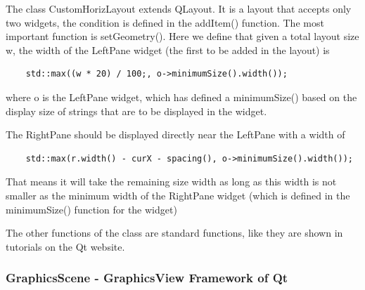 The class CustomHorizLayout extends QLayout. It is a layout that accepts only two widgets, the condition is defined in the addItem() function. The most important function is setGeometry(). Here we define that given a total layout size w, the width of the LeftPane widget (the first to be added in the layout) is

\begin{lstlisting}
	std::max((w * 20) / 100;, o->minimumSize().width());
\end{lstlisting}

where o is the LeftPane widget, which has defined a minimumSize() based on the display size of strings that are to be displayed in the widget.

The RightPane should be displayed directly near the LeftPane with a width of 

\begin{lstlisting}
	std::max(r.width() - curX - spacing(), o->minimumSize().width());
\end{lstlisting}

That means it will take the remaining size width as long as this width is not smaller as the minimum width of the RightPane widget (which is defined in the minimumSize() function for the widget)

The other functions of the class are standard functions, like they are shown in tutorials on the Qt website.

\subsubsection {GraphicsScene - GraphicsView Framework of Qt}